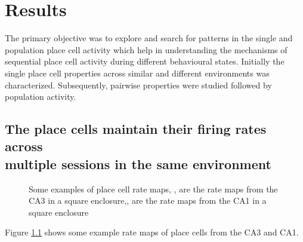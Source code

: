 \chapter{Results}
\label{results}

The primary objective was to explore and search for patterns in the single and population place cell activity which help in understanding the mechanisms of sequential place cell activity during different behavioural states. Initially the single place cell properties across similar and different environments was characterized. Subsequently, pairwise properties were studied followed by population activity. \\

\section[Place cell firing in same environment]{The place cells maintain their firing rates across \\ multiple sessions in the same environment}


\begin{figure}[htb!]
\centering
{}
\caption[Rate maps]{Some examples of place cell rate maps, ,  are the rate maps from the CA3 in a square enclosure,,  are the rate maps from the CA1 in a square enclosure}
\label{fig:rm}
\end{figure}
Figure \ref{fig:rm} shows some example rate maps of place cells from the CA3 and CA1. 

